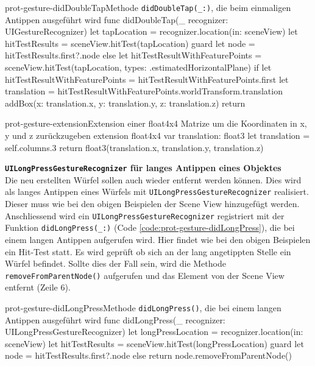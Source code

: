 \begin{description}
    \begin{code}{prot-gesture-didDoubleTap}{Methode \texttt{didDoubleTap(\_:)}, die beim einmaligen Antippen ausgeführt wird}
    func didDoubleTap(_ recognizer: UIGestureRecognizer) {
        let tapLocation = recognizer.location(in: sceneView)
        let hitTestResults = sceneView.hitTest(tapLocation)
        guard let node = hitTestResults.first?.node else {
            let hitTestResultWithFeaturePoints = sceneView.hitTest(tapLocation, types: .estimatedHorizontalPlane)
            if let hitTestResultWithFeaturePoints = hitTestResultWithFeaturePoints.first {
                let translation = hitTestResultWithFeaturePoints.worldTransform.translation
                addBox(x: translation.x, y: translation.y, z: translation.z)
            }
            return
        }
    }
    \end{code}

    \begin{code}{prot-gesture-extension}{Extension einer float4x4 Matrize um die Koordinaten in x, y und z zurückzugeben}
    extension float4x4 {
        var translation: float3 {
            let translation = self.columns.3
            return float3(translation.x, translation.y, translation.z)
        }
    }
    \end{code}

    \textbf{\texttt{UILongPressGestureRecognizer} für langes Antippen eines Objektes}\\
    Die neu erstellten Würfel sollen auch wieder entfernt werden können. Dies wird als langes Antippen eines Würfels mit \texttt{UILongPressGestureRecognizer} realisiert. Dieser muss wie bei den obigen Beispielen der Scene View hinzugefügt werden. Anschliessend wird ein \texttt{UILongPressGestureRecognizer} registriert mit der Funktion \texttt{didLongPress(\_:)} (Code \ref{code:prot-gesture-didLongPress}), die bei einem langen Antippen aufgerufen wird. Hier findet wie bei den obigen Beispielen ein Hit-Test statt. Es wird geprüft ob sich an der lang angetippten Stelle ein Würfel befindet. Sollte dies der Fall sein, wird die Methode \texttt{removeFromParentNode()} aufgerufen und das Element von der Scene View entfernt (Zeile 6).

    \begin{code}{prot-gesture-didLongPress}{Methode \texttt{didLongPress()}, die bei einem langen Antippen ausgeführt wird}
    func didLongPress(\_ recognizer: UILongPressGestureRecognizer) {
        let longPressLocation = recognizer.location(in: sceneView)
        let hitTestResults = sceneView.hitTest(longPressLocation)
        guard let node = hitTestResults.first?.node else { return }
        node.removeFromParentNode()
    }
    \end{code}


\end{description}
